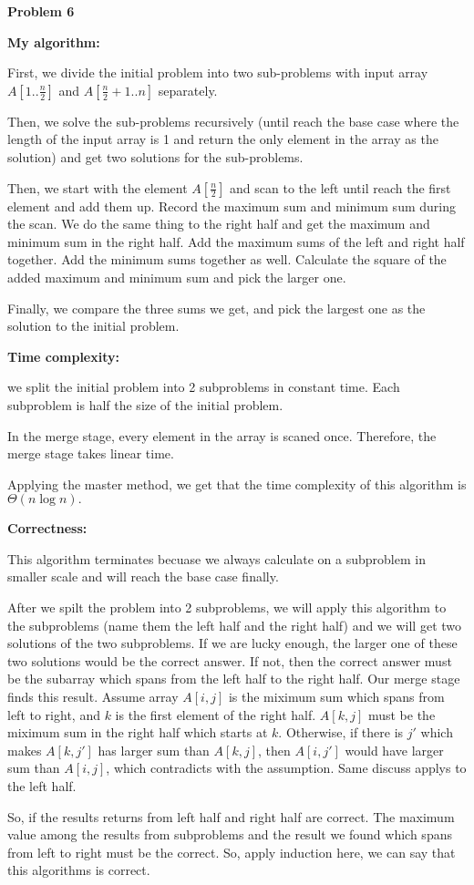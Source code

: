 \documentclass[12pt,letterpaper]{article}
\def\pp{\par\noindent}
\newcommand{\problem}[1]{ \bigskip \pp \textbf{Problem #1}\par}
\begin{document}
\problem{6}
\textbf{My algorithm:}\par
First, we divide the initial problem into two sub-problems with input array $A[1..\frac{n}{2}]$ and $A[\frac{n}{2}+1..n]$ separately.\par 
Then, we solve the sub-problems recursively (until reach the base case where the length of the input array is 1 and return the only element in the array as the solution) and get two solutions for the sub-problems.\par
Then, we start with the element $A[\frac{n}{2}]$ and scan to the left until reach the first element and add them up. Record the maximum sum and minimum sum during the scan. We do the same thing to the right half and get the maximum and minimum sum in the right half. Add the maximum sums of the left and right half together. Add the minimum sums together as well. Calculate the square of the added maximum and minimum sum and pick the larger one.\par
Finally, we compare the three sums we get, and pick the largest one as the solution to the initial problem.\par
\textbf{Time complexity:}\par
 we split the initial problem into 2 subproblems in constant time. Each subproblem is half the size of the initial problem.\par
In the merge stage, every element in the array is scaned once. Therefore, the merge stage takes linear time.\par
Applying the master method, we get that the time complexity of this algorithm is $\Theta(n\log n).$\par
\textbf{Correctness:}\par
This algorithm terminates becuase we always calculate on a subproblem in smaller scale and will reach the base case finally.\par
After we spilt the problem into 2 subproblems, we will apply this algorithm to the subproblems (name them the left half and the right half) and we will get two solutions of the two subproblems. If we are lucky enough, the larger one of these two solutions would be the correct answer. If not, then the correct answer must be the subarray which spans from the left half to the right half. Our merge stage finds this result. Assume array $A[i, j]$ is the miximum sum which spans from left to right, and $k$ is the first element of the right half. $A[k, j]$ must be the miximum sum in the right half which starts at $k$. Otherwise, if there is $j'$ which makes $A[k, j']$ has larger sum than $A[k, j]$, then $A[i, j']$ would have larger sum than $A[i, j]$, which contradicts with the assumption. Same discuss applys to the left half.\par
So, if the results returns from left half and right half are correct. The maximum value among the results from subproblems and the result we found which spans from left to right must be the correct. So, apply induction here, we can say that this algorithms is correct.\par
\end{document}
